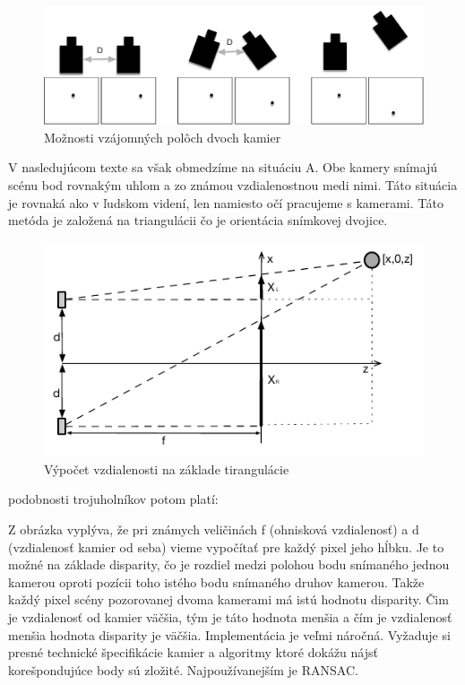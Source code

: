 \begin{figure}[H]
\begin{center}
	\includegraphics[scale=0.5]{obrazky/poloha_kamier_3D}
	\caption{Možnosti vzájomných polôch dvoch kamier}
	\end{center}
\end{figure}


V nasledujúcom texte sa však obmedzíme na situáciu A. Obe kamery snímajú scénu bod rovnakým uhlom a zo známou vzdialenostnou medi nimi. Táto situácia je rovnaká ako v ľudskom videní, len namiesto očí pracujeme s kamerami. Táto metóda je založená na triangulácii čo je orientácia snímkovej dvojice. 

\begin{figure}[H]
\begin{center}
	\includegraphics[scale=1.8]{obrazky/triangulacia}
	\caption{Výpočet vzdialenosti na základe tirangulácie}
	\end{center}
\end{figure}

podobnosti trojuholníkov potom platí:


Z obrázka vyplýva, že pri známych veličinách f (ohnisková vzdialenosť) a d (vzdialenosť kamier od seba) vieme vypočítať pre každý pixel jeho hĺbku. Je to možné na základe disparity, čo je rozdiel medzi polohou bodu snímaného jednou kamerou oproti pozícii toho istého bodu snímaného druhov kamerou. Takže každý pixel scény pozorovanej dvoma kamerami má istú hodnotu disparity. Čim je vzdialenosť od kamier väčšia, tým je táto hodnota menšia a čím je vzdialenosť menšia hodnota disparity je väčšia. Implementácia je veľmi náročná. Vyžaduje si presné technické špecifikácie kamier a algoritmy  ktoré dokážu nájsť korešpondujúce body sú zložité. Najpoužívanejším je RANSAC. 

